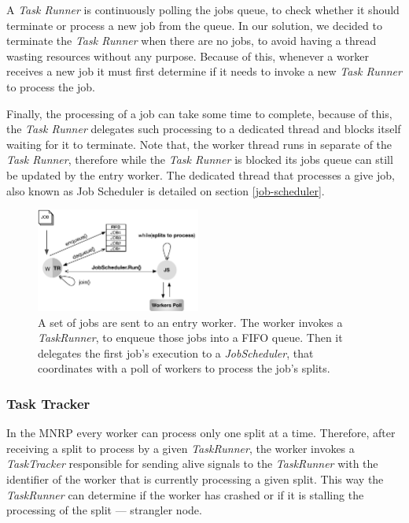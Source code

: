 \documentclass[times, 10pt,twocolumn]{article}
\begin{document}
            A \emph{Task Runner} is continuously polling the jobs queue, to check whether it should terminate or process a new job from the queue. In our solution, we decided to terminate the \emph{Task Runner} when there are no jobs, to avoid having a thread wasting resources without any purpose. Because of this, whenever a worker receives a new job it must first determine if it needs to invoke a new \emph{Task Runner} to process the job.
            
            Finally, the processing of a job can take some time to complete, because of this, the \emph{Task Runner} delegates such processing to a dedicated thread and blocks itself waiting for it to terminate. Note that, the worker thread runs in separate of the \emph{Task Runner}, therefore while the \emph{Task Runner} is blocked its jobs queue can still be updated by the entry worker. The dedicated thread that processes a give job, also known as Job Scheduler is detailed on section \ref{job-scheduler}.

            \begin{figure}[h]
                \begin{center}
                    \includegraphics[width=0.48\textwidth]{pics/taskrunner-example.pdf}
                    \caption{A set of jobs are sent to an entry worker. The worker invokes a \textit{TaskRunner}, to enqueue those jobs into a FIFO queue. Then it delegates the first job's execution to a \textit{JobScheduler}, that coordinates with a poll of workers to process the job's splits.}
                    \label{fig:mnr-taskrunner-example}
                \end{center}
            \end{figure}

            \subsubsection{Task Tracker}
            
           In the \ac{MNRP} every worker can process only one split at a time. Therefore, after receiving a split to process by a given \textit{TaskRunner}, the worker invokes a \textit{TaskTracker} responsible for sending alive signals to the \textit{TaskRunner} with the identifier of the worker that is currently processing a given split. This way the \textit{TaskRunner} can determine if the worker has crashed or if it is stalling the processing of the split — strangler node.
\end{document}
